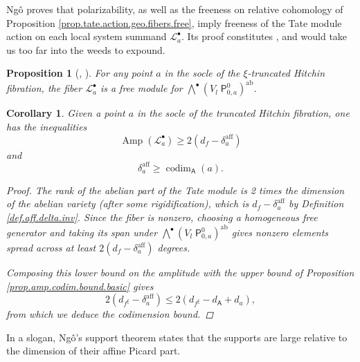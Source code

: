 \documentclass[openany]{amsbook}
\newtheorem{proposition}[theorem]{Proposition}
\newtheorem{corollary}[theorem]{Corollary}
\theoremstyle{definition}
\theoremstyle{remark}
\numberwithin{equation}{section}
\newcommand{\cL}{\mathcal{L}}
\renewcommand{\-}{\operatorname{-}}
\newcommand{\Amp}{\operatorname{Amp}}
\newcommand{\on}[1]{\operatorname{#1}}
\newcommand{\bA}{\mathsf{A}}
\newcommand{\bP}{\mathsf{P}}
\newcommand{\aff}{\mathrm{aff}}
\newcommand{\ab}{\mathrm{ab}}
\newcommand{\codim}{\on{codim}}
\newcommand{\Tate}{V_l \;}
\begin{document}
Ng\^{o} proves that polarizability, as well as the freeness on relative cohomology of Proposition \ref{prop.tate.action.geo.fibers.free}, imply freeness of the Tate module action on each local system summand $\cL_a^\bullet$. Its proof constitutes \cite[\S 7.5-7.7]{ngofl}, and would take us too far into the weeds to expound. 

\begin{proposition}[{{\cite[Proposition 10.3.1]{CLII}, \cite[7.4.10]{ngofl}}}]
    For any point $a$ in the socle of the $\xi$-truncated Hitchin fibration, the fiber $\cL_a^\bullet$ is a free module for $\bigwedge^\bullet (\Tate \bP^0_{0,a})^{\ab}$.
\end{proposition}

\begin{corollary}\label{cor.amp.codim.bound.hard}
    Given a point $a$ in the socle of the truncated Hitchin fibration, one has the inequalities
    $$
        \Amp(\cL_a^{\bullet}) \ge 2(d_f - \delta_a^{\aff})
    $$
    and
    $$
        \delta_a^{\aff} \ge \codim_{\bA}(a).
    $$
    \begin{proof}
        The rank of the abelian part of the Tate module is 2 times the dimension of the abelian variety (after some rigidification), which is $d_f - \delta_a^{\aff}$ by Definition \ref{def.aff.delta.inv}. Since the fiber is nonzero, choosing a homogeneous free generator and taking its span under $\bigwedge^\bullet (\Tate \bP^0_{0,a})^{\ab}$ gives nonzero elements spread across at least $2(d_f - \delta_a^{\aff})$ degrees.

        Composing this lower bound on the amplitude with the upper bound of Proposition \ref{prop.amp.codim.bound.basic} gives
        $$
            2(d_{f^\xi} - \delta_a^{\aff}) \le 2(d_{f^\xi} - d_{\bA} + d_a), 
        $$
        from which we deduce the codimension bound.
    \end{proof}
\end{corollary}

In a slogan, Ng\^{o}'s support theorem states that the supports are large relative to the dimension of their affine Picard part.
\end{document}
